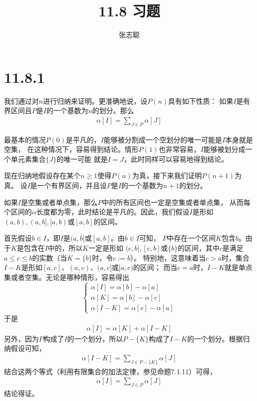 \documentclass{article}
\begin{document}
\title{11.8 习题}
\author{张志聪}
\maketitle

\section*{11.8.1}

我们通过对$n$进行归纳来证明。更准确地说，设$P(n)$具有如下性质：
如果$I$是有界区间且$P$是$I$的一个基数为$n$的划分。那么
\begin{align*}
  \alpha[I] = \sum\limits_{J \in P} \alpha[J]
\end{align*}

最基本的情况$P(0)$是平凡的，$I$能够被分割成一个空划分的唯一可能是$I$本身就是空集，
在这种情况下，容易得到结论。情形$P(1)$也非常容易，$I$能够被划分成一个单元素集合$\{J\}$的唯一可能
就是$I = J$，此时同样可以容易地得到结论。

现在归纳地假设存在某个$n \geq 1$使得$P(n)$为真，接下来我们证明$P(n + 1)$为真。
设$I$是一个有界区间，并且设$P$是$I$的一个基数为$n + 1$的划分。

如果$I$是空集或者单点集，那么$P$中的所有区间也一定是空集或者单点集，
从而每个区间的$\alpha$长度都为零，此时结论是平凡的。因此，我们假设$I$是形如
$(a, b), (a, b], [a, b)$或$[a, b]$的区间。

        首先假设$b \in I$，即$I$是$(a, b]$或$[a, b]$。由$b \in I$可知，
$P$中存在一个区间$K$包含$b$。由于$K$是包含在$I$中的，所以$K$一定是形如
$(c,b], [c, b]$或$\{b\}$的区间，其中$c$是满足$a \leq c \leq b$的实数（当$K = \{b\}$时，令$c := b$）。
特别地，这意味着当$c > a$时，集合$I - K$是形如$[a, c]$、$(a, c)$、$(a, c]$或$[a, c)$的区间；
而当$c = a$时，$I - K$就是单点集或者空集。无论是哪种情形，容易得出
\begin{equation*}
  \begin{cases*}
    \alpha[I] = \alpha[b] - \alpha[a] \\
    \alpha[K] = \alpha[b] - \alpha[c] \\
    \alpha[I - K] = \alpha[c] - \alpha[a]
  \end{cases*}
\end{equation*}
于是
\begin{align*}
  \alpha[I] = \alpha[K] + \alpha[I - K]
\end{align*}
另外，因为$P$构成了$I$的一个划分，所以$P - \{K\}$构成了$I - K$的一个划分。根据归纳假设可知，
\begin{align*}
  \alpha[I - K] = \sum\limits_{J \in P - \{K\}} \alpha[J]
\end{align*}
结合这两个等式（利用有限集合的加法定律，参见命题7.1.11）可得，
\begin{align*}
  \alpha[I] = \sum\limits_{J \in P} \alpha[J]
\end{align*}
结论得证。
\end{document}
